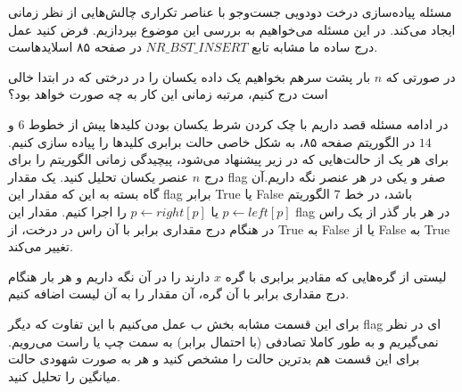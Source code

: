 ‌مسئله
پیاده‌سازی درخت دودویی جست‌وجو با عناصر تکراری چالش‌هایی از نظر زمانی ایجاد می‌کند. در این مسئله می‌خواهیم به بررسی این موضوع بپردازیم. فرض کنید عمل درج ساده ما مشابه تابع $NR\_BST\_INSERT$ در صفحه ۸۵ اسلایدهاست.

در صورتی که $n$ بار پشت سرهم بخواهیم یک داده یکسان را در درختی که در ابتدا خالی است درج کنیم، مرتبه زمانی این کار به چه صورت خواهد بود؟

در ادامه مسئله قصد داریم با چک کردن شرط یکسان بودن کلید‌ها پیش از خطوط $6$ و $14$ در الگوریتم صفحه ۸۵، به شکل‌ خاصی حالت برابری کلید‌ها را پیاده سازی کنیم. برای هر یک از حالت‌هایی که در زیر پیشنهاد می‌شود، پیچیدگی زمانی الگوریتم را برای درج $n$ عنصر یکسان تحلیل کنید.
یک مقدار flag صفر و یکی در هر عنصر نگه داریم.آن گاه بسته به این که مقدار این flag برابر True یا False باشد، در خط 7 الگوریتم
$p \leftarrow left[p]$
یا
$p \leftarrow right[p]$
را اجرا کنیم. مقدار این flag در هر بار گذر از یک راس در هنگام درج مقداری برابر با آن راس در درخت، از True به False یا از False به True تغییر می‌کند.

لیستی از گره‌هایی که مقادیر برابری با گره $x$ دارند را در آن نگه داریم و هر بار هنگام درج مقداری برابر با آن گره، آن مقدار را به آن لیست اضافه کنیم.

برای این قسمت مشابه بخش ب عمل می‌کنیم با این تفاوت که دیگر flag ای در نظر نمی‌گیریم و به طور کاملا تصادفی (با احتمال برابر) به سمت چپ یا راست می‌رویم. برای این قسمت هم بدترین حالت را مشخص کنید و هر به صورت شهودی حالت میانگین را تحلیل کنید.




